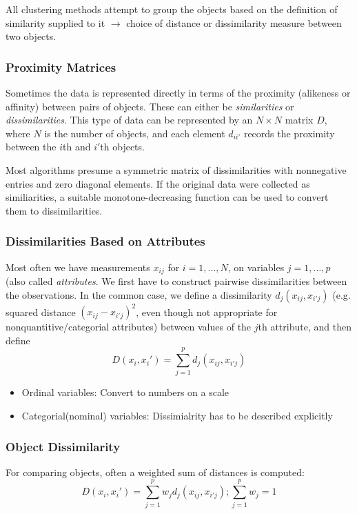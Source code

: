 \documentclass{scrartcl}
\begin{document}
All clustering methods attempt to group the objects based on the definition of similarity supplied to it \(\rightarrow\) choice of distance or dissimilarity measure between two objects.

\subsubsection{Proximity Matrices}
Sometimes the data is represented directly in terms of the proximity (alikeness or affinity) between pairs of objects. These can either be \textit{similarities} or \textit{dissimilarities}. This type of data can be represented by an \(N \times N\) matrix \(D\), where \(N\) is the number of objects, and each element \(d_{ii'}\) records the proximity between the \(i\)th and \(i'\)th objects.

Most algorithms presume a symmetric matrix of dissimilarities with nonnegative entries and zero diagonal elements. If the original data were collected as similiarities, a suitable monotone-decreasing function can be used to convert them to dissimilarities.

\subsubsection{Dissimilarities Based on Attributes}
Most often we have measurements \(x_{ij}\) for \(i = 1, \dots, N\), on variables \(j=1,\dots, p\) (also called \textit{attributes}. We first have to construct pairwise dissimilarities between the observations. In the common case, we define a dissimilarity \(d_j(x_{ij}, x_{i'j})\) (e.g. squared distance \((x_{ij} - x_{i'j})^2\), even though not appropriate for nonquantitive/categorial attributes) between values of the \(j\)th attribute, and then define
\[D(x_i, x_i') = \sum_{j=1}^p d_j(x_{ij}, x_{i'j})\]

\begin{itemize}
    \item
        Ordinal variables: Convert to numbers on a scale 
    \item
        Categorial(nominal) variables: Dissimialrity has to be described explicitly
\end{itemize}

\subsubsection{Object Dissimilarity}
For comparing objects, often a weighted sum of distances is computed:
\[D(x_i, x_i') = \sum_{j=1}^p w_j d_j(x_{ij}, x_{i'j}); \sum_{j=1}^p w_j = 1\]
\end{document}
